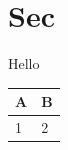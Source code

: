 \documentclass[twocolumn]{ctexart}
\begin{document}
\section{Sec}
Hello
\begin{table}[htbp]
  \centering
  \begin{tabular}{ll}
    \toprule A & B \\ \midrule 1 & 2 \\ \bottomrule
  \end{tabular}
\end{table}
\end{document}
